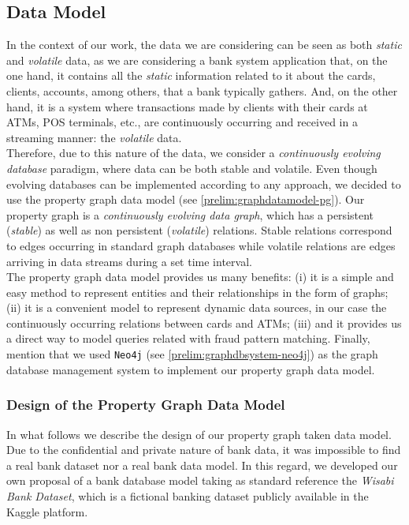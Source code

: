 
\subsection{Data Model}

In the context of our work, the data we are considering can be seen as both \emph{static} and \emph{volatile} data, as we are considering a bank system application that, on the one hand, it contains all the \emph{static} information related to it about the cards, clients, accounts, among others, that a bank typically gathers. And, on the other hand, it is a system where transactions made by clients with their cards at ATMs, POS terminals, etc., are continuously occurring and received in a streaming manner: the \emph{volatile} data.\\

Therefore, due to this nature of the data, we consider a \emph{continuously evolving database} paradigm, where data can be both stable and volatile. Even though 
evolving databases can be implemented according to any approach, we decided to use the property graph data model (see \ref{prelim:graphdatamodel-pg}). Our property graph is a \emph{continuously evolving data graph}, which has a persistent (\emph{stable}) as well as non persistent (\emph{volatile}) relations. Stable relations correspond to edges occurring in standard graph databases while volatile relations are edges arriving in data streams during a set time interval.\\

The property graph data model provides us many benefits: (i) it is a simple and easy method to represent entities and their relationships in the form of graphs; (ii) it is a convenient model to represent dynamic data sources, in our case the continuously occurring relations between cards and ATMs; (iii) and it provides us a direct way to model queries related with fraud pattern matching. Finally, mention that we used \texttt{Neo4j} (see \ref{prelim:graphdbsystem-neo4j}) as the graph database management system to implement our property graph data model. \\

\subsubsection*{Design of the Property Graph Data Model}

In what follows we describe the design of our property graph taken data model. Due to the confidential and private nature of bank data, it was impossible to find a real bank dataset nor a real bank data model. In this regard, we developed our own proposal of a bank database model taking as standard reference the \emph{Wisabi Bank Dataset}, which is a fictional banking dataset publicly available in the Kaggle platform\cite{wisabi-bank-dataset}.\\


